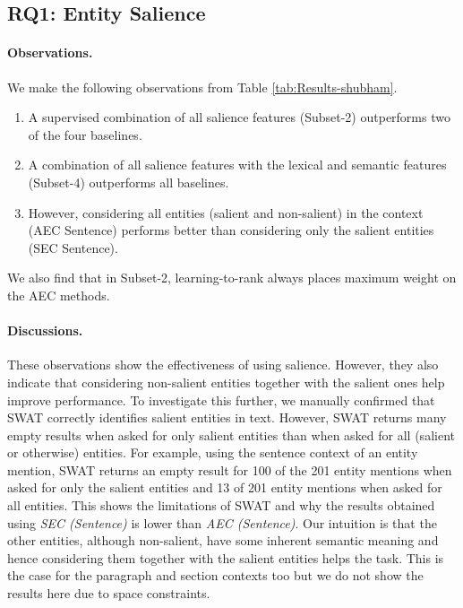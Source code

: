 
\subsection{RQ1: Entity Salience}
\label{subsec:Entity Salience}

\paragraph{\textbf{Observations.}}
We make the following observations from Table \ref{tab:Results-shubham}.
\begin{enumerate}
    \item A supervised combination of all salience features (Subset-2) outperforms two of the four baselines.
    \item A combination of all salience features with the lexical and semantic features (Subset-4) outperforms all baselines.
    \item However, considering all entities (salient and non-salient) in the context (AEC Sentence) performs better than considering only the salient entities (SEC Sentence).
\end{enumerate}
We also find that in Subset-2, learning-to-rank always places maximum weight on the AEC methods.

\paragraph{\textbf{Discussions.}}
These observations show the effectiveness of using salience. However, they also indicate that considering non-salient entities together with the salient ones help improve performance. To investigate this further, we manually confirmed that SWAT correctly identifies salient entities in text. However, SWAT returns many empty results when asked for only salient entities than when asked for all (salient or otherwise) entities.
For example, using the sentence context of an entity mention, SWAT returns an empty result for 100 of the 201 entity mentions when asked for only the salient entities and 13 of 201 entity mentions when asked for all  entities. 
This shows the limitations of SWAT and why the results obtained using \textit{SEC (Sentence)} is lower than \textit{AEC (Sentence)}.  Our intuition is that the other entities, although non-salient, have some inherent semantic meaning and hence considering them together with the salient entities helps the task. This is the case for the paragraph and section contexts too but we do not show the results here due to space constraints. 

